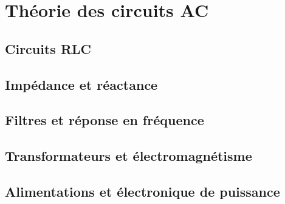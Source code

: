 \chapter{Théorie des circuits AC} \label{subsec:ac_circuit_theory}
\section{Circuits RLC} \label{subsec:rlc_circuits}
\section{Impédance et réactance} \label{subsec:impedance_reactance}
\section{Filtres et réponse en fréquence} \label{subsec:filters}
\section{Transformateurs et électromagnétisme} \label{subsec:transformers}
\section{Alimentations et électronique de puissance} \label{subsec:power_supplies}
